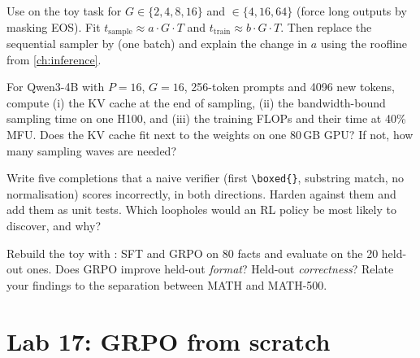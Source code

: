 \begin{exercise}
Use  on the toy task for $G\in\{2,4,8,16\}$ and
$\in\{4,16,64\}$ (force long outputs by masking EOS). Fit
$t_{\text{sample}}\approx a\cdot G\cdot T$ and $t_{\text{train}}\approx b\cdot G\cdot T$. Then
replace the sequential sampler by  (one batch) and explain the change
in $a$ using the roofline from \cref{ch:inference}.
\end{exercise}

\begin{exercise}
For Qwen3-4B with $P=16$, $G=16$, 256-token prompts and 4096 new tokens, compute (i) the KV
cache at the end of sampling, (ii) the bandwidth-bound sampling time on one H100, and (iii) the
training FLOPs and their time at 40\% MFU. Does the KV cache fit next to the weights on one
80\,GB GPU? If not, how many sampling waves are needed?
\end{exercise}

\begin{exercise}
Write five completions that a naive verifier (first \verb|\boxed{}|, substring
match, no normalisation) scores incorrectly, in both directions. Harden
 against them and add them as unit tests. Which loopholes would an RL
policy be most likely to discover, and why?
\end{exercise}

\begin{exercise}
Rebuild the toy with : SFT and GRPO on 80 facts and
evaluate on the 20 held-out ones. Does GRPO improve held-out \emph{format}? Held-out
\emph{correctness}? Relate your findings to the separation between MATH and MATH-500.
\end{exercise}

\section{Lab 17: GRPO from scratch}\label{sec:grpo:lab}

